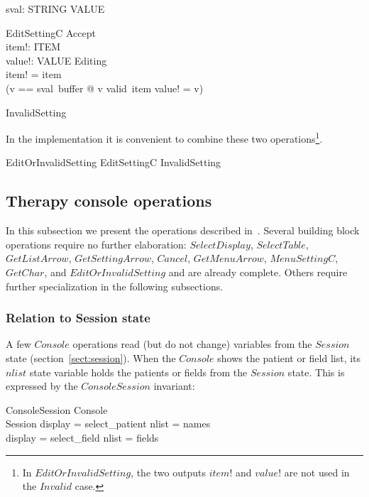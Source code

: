 \begin{axdef}
	sval: STRING \fun VALUE
\end{axdef}

\begin{schema}{EditSettingC}
	Accept \\
	item!: ITEM \\
	value!: VALUE
\where
	Editing \\
	item! = item \\
	(\LET v == sval~buffer @ v \in valid~item \land value! = v)
\end{schema}

\begin{zed}
InvalidSetting 
\end{zed}
In the implementation it is convenient to combine these two
operations\footnote{In $EditOrInvalidSetting$, the two outputs $item!$
and $value!$ are not used in the $Invalid$ case.}.

\begin{zed}
	EditOrInvalidSetting  EditSettingC \lor InvalidSetting
\end{zed}

\subsection{Therapy console operations} \label{sect:therapy-ops}

In this subsection we present the operations described
in~\cite{jacky92}.  Several building block operations require no
further elaboration: $SelectDisplay$, $SelectTable$, $GetListArrow$,
$GetSettingArrow$, $Cancel$, $GetMenuArrow$, $MenuSettingC$,
$GetChar$, and $EditOrInvalidSetting$ and are already complete.
Others require further specialization in the following subsections.

\subsubsection{Relation to Session state}

A few $Console$ operations read (but do not change) variables from the
$Session$ state (section~\ref{sect:session}).  When the $Console$
shows the patient or field list, its $nlist$ state variable holds the
patients or fields from the $Session$ state.  This is expressed by the
$ConsoleSession$ invariant:

\begin{schema}{ConsoleSession}
	Console \\
	Session
\where
	display = select\_patient \implies nlist = names \\
	display = select\_field \implies nlist = \dom fields
\end{schema}


